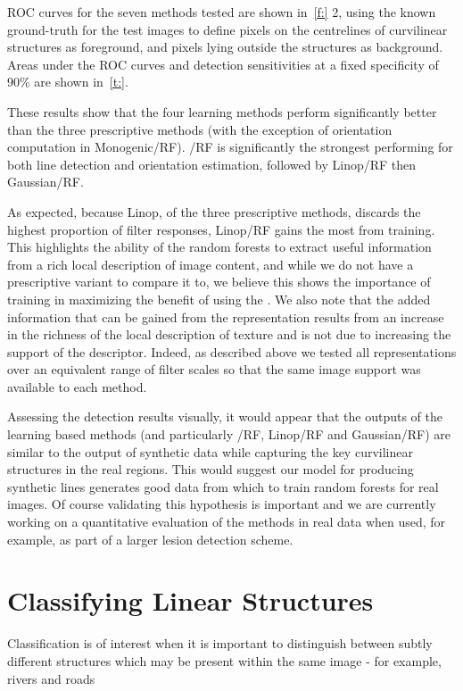 ROC curves for the seven methods tested are shown in~\ref{f:} 2, using the known ground-truth for the test images to define pixels on the centrelines of curvilinear structures as foreground, and pixels lying outside the structures as background. Areas under the ROC curves and detection sensitivities at a fixed specificity of 90\% are shown in~\ref{t:}. 

These results show that the four learning methods perform significantly better than the three prescriptive methods (with the exception of orientation computation in Monogenic/RF). \dtcwt/RF is significantly the strongest performing for both line detection and orientation estimation, followed by Linop/RF then Gaussian/RF.

As expected, because Linop, of the three prescriptive methods, discards the highest proportion of filter responses, Linop/RF gains the most from training. This highlights the ability of the random forests to extract useful information from a rich local description of image content, and while we do not have a prescriptive variant to compare it to, we believe this shows the importance of training in maximizing the benefit of using the \dtcwt. We also note that the added information that can be gained from the \dtcwt representation results from an increase in the richness of the local description of texture and is not due to increasing the support of the descriptor. Indeed, as described above we tested all representations over an equivalent range of filter scales so that the same image support was available to each method.

Assessing the detection results visually, it would appear that the outputs of the learning based methods (and particularly \dtcwt/RF, Linop/RF and Gaussian/RF) are similar to the output of synthetic data while capturing the key curvilinear structures in the real regions. This would suggest our model for producing synthetic lines generates good data from which to train random forests for real images. Of course validating this hypothesis is important and we are currently working on a quantitative evaluation of the methods in real data when used, for example, as part of a larger lesion detection scheme.


\section{Classifying Linear Structures}
Classification is of interest when it is important to distinguish between subtly different structures which may be present within the same image - for example, rivers and roads

